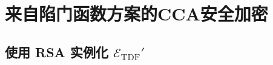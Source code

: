\section{来自陷门函数方案的CCA安全加密}\label{sec:12-3}

\begin{game}[即使只有像预言机的单向陷门函数方案]\label{game:12-2}
	
\end{game}

\begin{definition}\label{def:12-3}
	
\end{definition}

\begin{theorem}\label{theo:12-2}
	
\end{theorem}

\subsection{使用 RSA 实例化 $\mathcal{E}_\mathrm{TDF}'$}\label{subsec:12-3-1}

\begin{theorem}\label{theo:12-3}
	
\end{theorem}